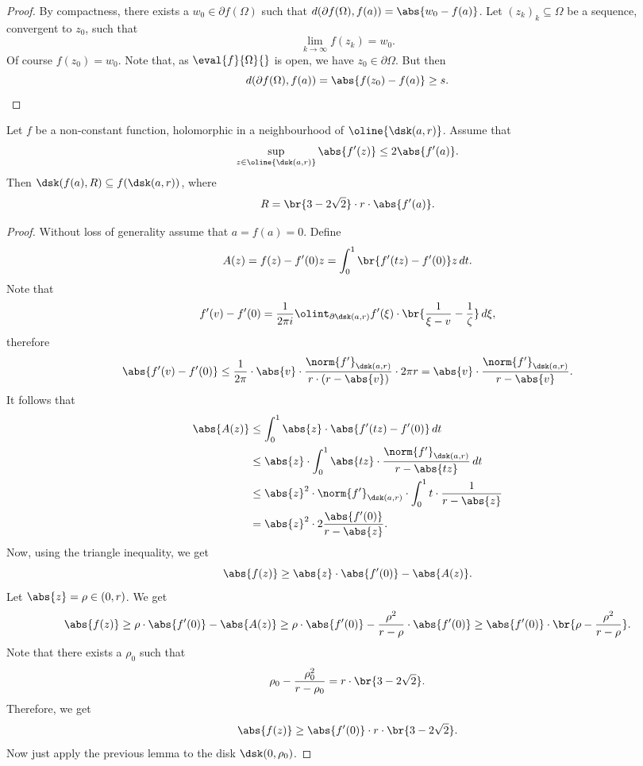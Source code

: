 \begin{proof}
By compactness, there exists a $w_0 \in \partial f(\Omega)$ such
that $d(\partial f(\Omega), f(a)) = \abs{w_0 - f(a)}$. Let
$(z_k)_k \subseteq \Omega$ be a sequence, convergent to $z_0$, such
that
\[
\lim_{k \to \infty} f(z_k) = w_0.
\]
Of course $f(z_0) = w_0$. Note that, as $\eval{f}{\Omega}{}$ is
open, we have $z_0 \in \partial \Omega$. But then
\[
d(\partial f(\Omega), f(a)) = \abs{f(z_0) - f(a)} \geq s. \qedhere
\]
\end{proof}

\begin{lema}
\label{thm_hol:lm:bloch}
Let $f$ be a non-constant function, holomorphic in a neighbourhood
of $\oline{\dsk(a, r)}$. Assume that
\[
\sup_{z \in \oline{\dsk(a,r)}} \abs{f'(z)} \leq 2 \abs{f'(a)}.
\]
Then $\dsk(f(a), R) \subseteq f(\dsk(a, r))$, where
\[
R = \br{3 - 2 \sqrt{2}} \cdot r \cdot \abs{f'(a)}.
\]
\end{lema}

\begin{proof}
Without loss of generality assume that $a = f(a) = 0$. Define
\[
A(z) = f(z) - f'(0) z = \int_0^1 \br{f'(tz) - f'(0)} z \,dt.
\]
Note that
\[
f'(v) - f'(0) =
\frac{1}{2 \pi i} \olint_{\partial \dsk(a, r)}
f'(\xi) \cdot \br{\frac{1}{\xi-v} - \frac{1}{\zeta}}\,d\xi,
\]
therefore
\[
\abs{f'(v) - f'(0)} \leq
\frac{1}{2 \pi} \cdot \abs{v} \cdot
\frac{\norm{f'}_{\dsk(a,r)}}{r \cdot (r - \abs{v})} \cdot 2 \pi r =
\abs{v} \cdot \frac{\norm{f'}_{\dsk(a,r)}}{r - \abs{v}}.
\]
It follows that
\begin{align*}
\abs{A(z)} &\leq
\int_0^1 \abs{z} \cdot \abs{f'(tz) - f'(0)}\,dt
\\
&\leq
\abs{z} \cdot \int_0^1
\abs{tz} \cdot \frac{\norm{f'}_{\dsk(a,r)}}{r - \abs{tz}}\,dt
\\
&\leq
\abs{z}^2 \cdot \norm{f'}_{\dsk(a,r)} \cdot \int_0^1
t \cdot \frac{1}{r - \abs{z}}
\\
&=
\abs{z}^2 \cdot
2 \frac{\abs{f'(0)}}{r - \abs{z}}.
\end{align*}
Now, using the triangle inequality, we get
\[
\abs{f(z)} \geq \abs{z} \cdot \abs{f'(0)} - \abs{A(z)}.
\]
Let $\abs{z} = \rho \in (0, r)$. We get
\[
\abs{f(z)} \geq
\rho \cdot \abs{f'(0)} - \abs{A(z)} \geq
\rho \cdot \abs{f'(0)} -
\frac{\rho^2}{r - \rho} \cdot \abs{f'(0)} \geq
\abs{f'(0)} \cdot \br{\rho - \frac{\rho^2}{r - \rho}}.
\]
Note that there exists a $\rho_0$ such that
\[
\rho_0 - \frac{\rho_0^2}{r - \rho_0} =
r \cdot \br{3 - 2 \sqrt{2}}.
\]
Therefore, we get
\[
\abs{f(z)} \geq \abs{f'(0)} \cdot r \cdot \br{3 - 2 \sqrt{2}}.
\]
Now just apply the previous lemma to the disk $\dsk(0, \rho_0)$.
\end{proof}

